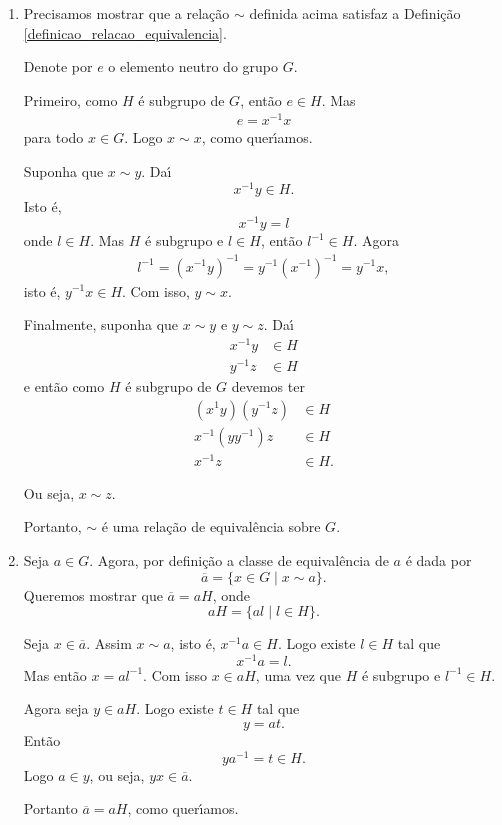 \begin{prova}
    \begin{enumerate}[label={\roman*})]
        \item Precisamos mostrar que a rela\c{c}\~ao $\sim$ definida acima satisfaz a Defini\c{c}\~ao \eqref{definicao_relacao_equivalencia}.

        Denote por $e$ o elemento neutro do grupo $G$.

        Primeiro, como $H$ \'e subgrupo de $G$, ent\~ao $e \in H$. Mas
        \begin{align*}
            e = x^{-1}x
        \end{align*}
        para todo $x \in G$. Logo $x \sim x$, como quer{\'\i}amos.

        Suponha que $x \sim y$. Da{\'\i}
        \[
            x^{-1}y \in H.
        \]
        Isto \'e,
        \[
            x^{-1}y = l
        \]
        onde $l \in H$. Mas $H$ \'e subgrupo e $l \in H$, ent\~ao $l^{-1} \in H$. Agora
        \begin{align*}
            l^{-1} = (x^{-1}y)^{-1} = y^{-1}(x^{-1})^{-1} = y^{-1}x,
        \end{align*}
        isto \'e, $y^{-1}x \in H$. Com isso, $y \sim x$.

        Finalmente, suponha que $x \sim y$ e $y \sim z$. Da{\'\i}
        \begin{align*}
            x^{-1}y &\in H\\
            y^{-1}z &\in H
        \end{align*}
        e ent\~ao como $H$ \'e subgrupo de $G$ devemos ter
        \begin{align*}
            (x^{1}y)(y^{-1}z) &\in H\\
            x^{-1}(yy^{-1})z &\in H\\
            x^{-1}z &\in H.
        \end{align*}

        Ou seja, $x \sim z$.

        Portanto, $\sim$ \'e uma rela\c{c}\~ao de equival\^encia sobre $G$.

        \item Seja $a \in G$. Agora, por defini\c{c}\~ao a classe de equival\^encia de $a$ \'e dada por
        \[
            \overline{a} = \{ x \in G \mid x \sim a\}.
        \]
        Queremos mostrar que $\overline{a} = aH$, onde
        \[
            aH = \{al \mid l \in H\}.
        \]

        Seja $x \in \overline{a}$. Assim $x \sim a$, isto \'e, $x^{-1}a \in H$. Logo existe $l \in H$ tal que
        \[
            x^{-1}a = l.
        \]
        Mas ent\~ao $x = al^{-1}$. Com isso $x \in aH$, uma vez que $H$ \'e subgrupo e $l^{-1} \in H$.

        Agora seja $y \in aH$. Logo existe $t \in H$ tal que
        \[
            y = at.
        \]
        Ent\~ao
        \[
            ya^{-1} = t \in H.
        \]
        Logo $a \in y$, ou seja, $yx \in \overline{a}$.

        Portanto $\overline{a} = aH$, como quer{\'\i}amos.
    \end{enumerate}
\end{prova}

